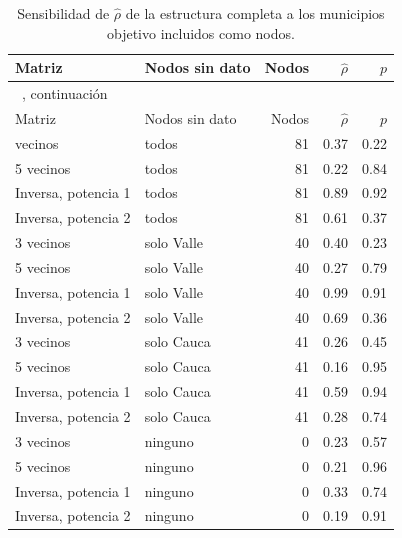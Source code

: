 {\footnotesize\setlength{\tabcolsep}{3pt}
\begin{longtable}{l l r r r}
\caption[Sensibilidad de $\hat{\rho}$ a los nodos sin dato]{Sensibilidad de $\hat{\rho}$ de la estructura completa a los municipios objetivo incluidos como nodos.}
\label{tab:app_espacial_rho} \\
\toprule
Matriz & Nodos sin dato & Nodos & $\hat{\rho}$ & $p$ \\
\midrule
\endfirsthead
\multicolumn{5}{l}{\tablename~\thetable{}, continuación} \\
\toprule
Matriz & Nodos sin dato & Nodos & $\hat{\rho}$ & $p$ \\
\midrule
\endhead
\bottomrule
\endlastfoot
3 vecinos & todos & 81 & 0.37 & 0.22 \\
5 vecinos & todos & 81 & 0.22 & 0.84 \\
Inversa, potencia 1 & todos & 81 & 0.89 & 0.92 \\
Inversa, potencia 2 & todos & 81 & 0.61 & 0.37 \\
3 vecinos & solo Valle & 40 & 0.40 & 0.23 \\
5 vecinos & solo Valle & 40 & 0.27 & 0.79 \\
Inversa, potencia 1 & solo Valle & 40 & 0.99 & 0.91 \\
Inversa, potencia 2 & solo Valle & 40 & 0.69 & 0.36 \\
3 vecinos & solo Cauca & 41 & 0.26 & 0.45 \\
5 vecinos & solo Cauca & 41 & 0.16 & 0.95 \\
Inversa, potencia 1 & solo Cauca & 41 & 0.59 & 0.94 \\
Inversa, potencia 2 & solo Cauca & 41 & 0.28 & 0.74 \\
3 vecinos & ninguno & 0 & 0.23 & 0.57 \\
5 vecinos & ninguno & 0 & 0.21 & 0.96 \\
Inversa, potencia 1 & ninguno & 0 & 0.33 & 0.74 \\
Inversa, potencia 2 & ninguno & 0 & 0.19 & 0.91 \\
\end{longtable}
}
